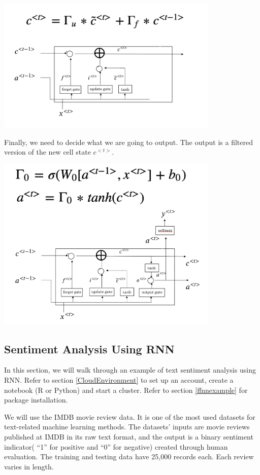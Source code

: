 \documentclass[12pt,]{krantz}
\begin{document}
\includegraphics[width=0.8\textwidth,height=\textheight]{images/lstm3.png}

Finally, we need to decide what we are going to output. The output is a filtered version of the new cell state \(c^{<t>}\).

\includegraphics[width=0.8\textwidth,height=\textheight]{images/lstm4.png}

\hypertarget{rnnexample}{%
\subsection{Sentiment Analysis Using RNN}\label{rnnexample}}

In this section, we will walk through an example of text sentiment analysis using RNN. Refer to section \ref{CloudEnvironment} to set up an account, create a notebook (R or Python) and start a cluster. Refer to section \ref{ffnnexample} for package installation.

We will use the IMDB movie review data. It is one of the most used datasets for text-related machine learning methods. The datasets' inputs are movie reviews published at IMDB in its raw text format, and the output is a binary sentiment indicator( ``1'' for positive and ``0'' for negative) created through human evaluation. The training and testing data have 25,000 records each. Each review varies in length.
\end{document}
